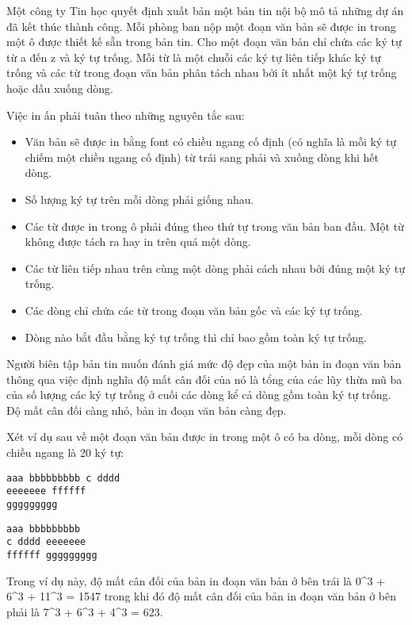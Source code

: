 



   Một công ty Tin học quyết định xuất bản một bản tin nội bộ mô tả những dự án đã kết thúc thành công. Mỗi phòng ban nộp một đoạn văn bản sẽ được in trong một ô được thiết kế sẵn trong bản tin. Cho một đoạn văn bản chỉ chứa các ký tự từ a đến z và ký tự trống. Mỗi từ là một chuỗi các ký tự liên tiếp khác ký tự trống và các từ trong đoạn văn bản phân tách nhau bởi ít nhất một ký tự trống hoặc dấu xuống dòng.  

   Việc in ấn phải tuân theo những nguyên tắc sau:  
\begin{itemize}
	\item     Văn bản sẽ được in bằng font có chiều ngang cố định (có nghĩa là mỗi ký tự chiếm một chiều ngang cố định) từ trái sang phải và xuống dòng khi hết dòng.   
	\item     Số lượng ký tự trên mỗi dòng phải giống nhau.   
	\item     Các từ được in trong ô phải đúng theo thứ tự trong văn bản ban đầu. Một từ không được tách ra hay in trên quá một dòng.   
	\item     Các từ liên tiếp nhau trên cùng một dòng phải cách nhau bởi đúng một ký tự trống.   
	\item     Các dòng chỉ chứa các từ trong đoạn văn bản gốc và các ký tự trống.   
	\item     Dòng nào bắt đầu bằng ký tự trống thì chỉ bao gồm toàn ký tự trống.   
\end{itemize}

   Người biên tập bản tin muốn đánh giá mức độ đẹp của một bản in đoạn văn bản thông qua việc định nghĩa  độ mất cân đối của nó là tổng của các lũy thừa mũ ba của số lượng các ký tự trống ở cuối các dòng kể cả dòng gồm toàn ký tự trống. Độ mất cân đối càng nhỏ, bản in đoạn văn bản càng đẹp.  

   Xét ví dụ sau về một đoạn văn bản được in trong một ô có ba dòng, mỗi dòng có chiều ngang là 20 ký tự:  
\begin{verbatim}
aaa bbbbbbbbb c dddd
eeeeeee ffffff
ggggggggg		
\end{verbatim}
\begin{verbatim}
aaa bbbbbbbbb      
c dddd eeeeeee       
ffffff ggggggggg
\end{verbatim}

   Trong ví dụ này, độ mất cân đối của bản in đoạn văn bản ở bên trái là 0^3 + 6^3 + 11^3 = 1547 trong khi đó độ mất cân đối của bản in đoạn văn bản ở bên phải là 7^3 + 6^3 + 4^3 = 623.  

